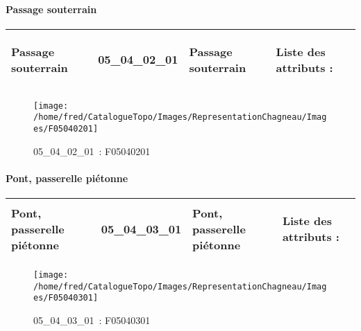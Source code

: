 \documentclass[12pt,titlepage,oneside]{book}
\begin{document}
\paragraph{Passage souterrain}
\noindent
\vspace{\baselineskip}

\renewcommand{\arraystretch}{1.2}
\begin{supertabular}{|p{10cm}|c|p{13cm}|p{12cm}|}
 Passage souterrain & 05\_04\_02\_01 & Passage souterrain & Liste des attributs :
\begin{enumerate}
\end{enumerate}
\\
\hline
\end{supertabular}
\begin{figure}[h!]
  \hfill         %
  \begin{minipage}[t]{3cm}
    \begin{center}
      \texttt{[image: /home/fred/CatalogueTopo/Images/RepresentationChagneau/Images/F05040201]}
      \caption[~05\_04\_02\_01]{\small{05\_04\_02\_01~:} \tiny{F05040201}}\label{F05040201}
    \end{center}
  \end{minipage}
\end{figure}


\paragraph{Pont, passerelle piétonne}
\noindent
\vspace{\baselineskip}

\renewcommand{\arraystretch}{1.2}
\begin{supertabular}{|p{10cm}|c|p{13cm}|p{12cm}|}
 Pont, passerelle piétonne & 05\_04\_03\_01 & Pont, passerelle piétonne & Liste des attributs :
\begin{enumerate}
\end{enumerate}
\\
\hline
\end{supertabular}
\begin{figure}[h!]
  \hfill         %
  \begin{minipage}[t]{3cm}
    \begin{center}
      \texttt{[image: /home/fred/CatalogueTopo/Images/RepresentationChagneau/Images/F05040301]}
      \caption[~05\_04\_03\_01]{\small{05\_04\_03\_01~:} \tiny{F05040301}}\label{F05040301}
    \end{center}
  \end{minipage}
\end{figure}
\end{document}
